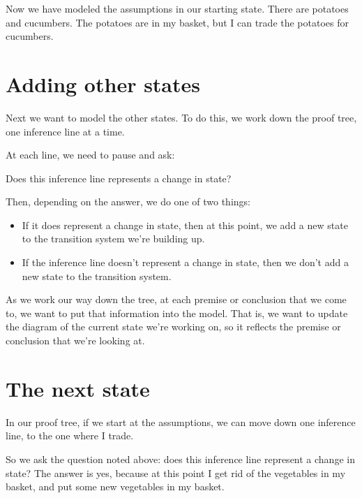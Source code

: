 \documentclass[../../../main.tex]{subfiles}
\begin{document}
\noindent
Now we have modeled the assumptions in our starting state. There are potatoes and cucumbers. The potatoes are in my basket, but I can trade the potatoes for cucumbers.


\section{Adding other states}

Next we want to model the other states. To do this, we work down the proof tree, one inference line at a time. 

At each line, we need to pause and ask:

\begin{center}
  Does this inference line represents a change in state?
\end{center}

\noindent
Then, depending on the answer, we do one of two things:

\begin{itemize}
  \item{If it does represent a change in state, then at this point, we add a new state to the transition system we're building up.}
  \item{If the inference line doesn't represent a change in state, then we don't add a new state to the transition system.}
\end{itemize}

\noindent
As we work our way down the tree, at each premise or conclusion that we come to, we want to put that information into the model. That is, we want to update the diagram of the current state we're working on, so it reflects the premise or conclusion that we're looking at.


\section{The next state}

In our proof tree, if we start at the assumptions, we can move down one inference line, to the one where I trade. 

So we ask the question noted above: does this inference line represent a change in state? The answer is yes, because at this point I get rid of the vegetables in my basket, and put some new vegetables in my basket.
\end{document}

